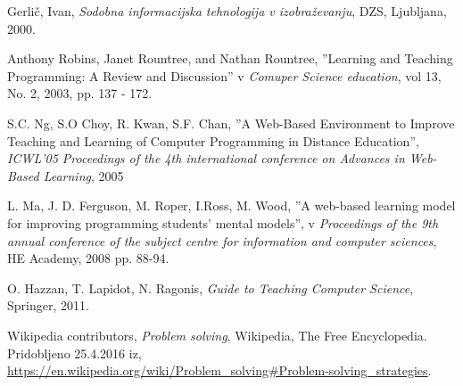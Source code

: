 \begin{thebibliography}{9}

%



  Gerlič, Ivan, \emph{Sodobna informacijska tehnologija v
    izobraževanju}, DZS, Ljubljana, 2000.


  Anthony Robins, Janet Rountree, and Nathan Rountree,
  ''Learning and Teaching Programming: A Review and
  Discussion'' v \emph{Comuper Science education}, vol 13, No. 2,
  2003, pp. 137 - 172.

  S.C. Ng, S.O Choy, R. Kwan, S.F. Chan,
  ''A Web-Based Environment to Improve Teaching and Learning of
  Computer Programming in Distance Education'', \emph{ICWL'05
    Proceedings of the 4th international conference on Advances in
    Web-Based Learning}, 2005

  L. Ma, J. D. Ferguson, M. Roper, I.Ross, M. Wood,
  ''A web-based learning model for improving programming students' mental
  models'', v \emph{Proceedings of the 9th annual conference of the subject
  centre for information and computer sciences}, HE Academy, 2008
  pp. 88-94.

  O. Hazzan, T. Lapidot, N. Ragonis,
  \emph{Guide to Teaching Computer Science}, Springer, 2011.

 Wikipedia contributors, \emph{Problem
    solving}, Wikipedia, The Free Encyclopedia. Pridobljeno 25.4.2016
  iz,
  \url{https://en.wikipedia.org/wiki/Problem_solving#Problem-solving_strategies}.


\end{thebibliography}
